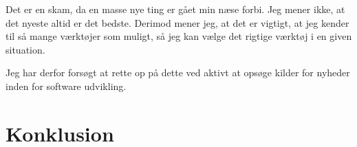 \documentclass[a4paper]{article}
\begin{document}
Det er en skam, da en masse nye ting er gået min næse forbi.
Jeg mener ikke, at det nyeste altid er det bedste.
Derimod mener jeg, at det er vigtigt,
at jeg kender til så mange værktøjer som muligt,
så jeg kan vælge det rigtige værktøj i en given situation.

Jeg har derfor forsøgt at rette op på dette ved aktivt at opsøge kilder for nyheder inden for software udvikling.

\newpage
\section{Konklusion}
\end{document}
